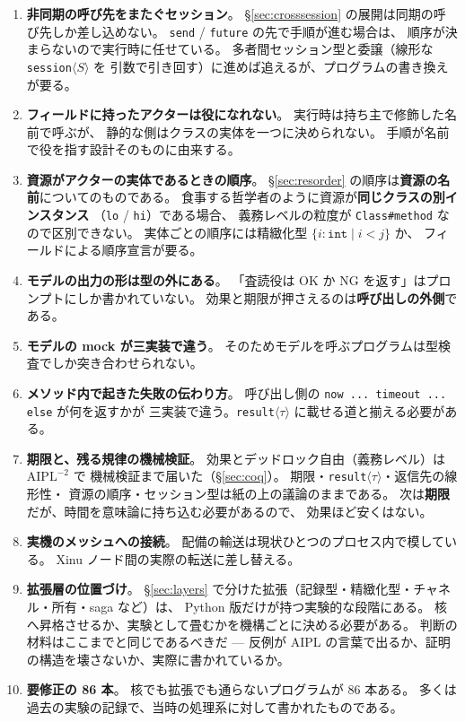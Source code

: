 \documentclass[11pt,a4paper]{ltjsarticle}
\theoremstyle{definition}
\theoremstyle{remark}
\begin{document}
\begin{enumerate}
\item \textbf{非同期の呼び先をまたぐセッション}。
      \S\ref{sec:crosssession} の展開は同期の呼び先しか差し込めない。
      \texttt{send} / \texttt{future} の先で手順が進む場合は、
      順序が決まらないので実行時に任せている。
      多者間セッション型と委譲（線形な \texttt{session}$\langle S\rangle$ を
      引数で引き回す）に進めば追えるが、プログラムの書き換えが要る。
\item \textbf{フィールドに持ったアクターは役になれない}。
      実行時は持ち主で修飾した名前で呼ぶが、
      静的な側はクラスの実体を一つに決められない。
      手順が名前で役を指す設計そのものに由来する。
\item \textbf{資源がアクターの実体であるときの順序}。
      \S\ref{sec:resorder} の順序は\textbf{資源の名前}についてのものである。
      食事する哲学者のように資源が\textbf{同じクラスの別インスタンス}
      （\texttt{lo} / \texttt{hi}）である場合、
      義務レベルの粒度が \texttt{Class\#method} なので区別できない。
      実体ごとの順序には精緻化型 $\{i:\mathtt{int} \mid i < j\}$ か、
      フィールドによる順序宣言が要る。
\item \textbf{モデルの出力の形は型の外にある}。
      「査読役は OK か NG を返す」はプロンプトにしか書かれていない。
      効果と期限が押さえるのは\textbf{呼び出しの外側}である。
\item \textbf{モデルの mock が三実装で違う}。
      そのためモデルを呼ぶプログラムは型検査でしか突き合わせられない。
\item \textbf{メソッド内で起きた失敗の伝わり方}。
      呼び出し側の \texttt{now ... timeout ... else} が何を返すかが
      三実装で違う。\texttt{result}$\langle\tau\rangle$ に載せる道と揃える必要がある。
\item \textbf{期限と、残る規律の機械検証}。
      効果とデッドロック自由（義務レベル）は $\mathrm{AIPL}^{-2}$ で
      機械検証まで届いた（\S\ref{sec:coq}）。
      期限・\texttt{result}$\langle\tau\rangle$・返信先の線形性・
      資源の順序・セッション型は紙の上の議論のままである。
      次は\textbf{期限}だが、時間を意味論に持ち込む必要があるので、
      効果ほど安くはない。
\item \textbf{実機のメッシュへの接続}。
      配備の輸送は現状ひとつのプロセス内で模している。
      Xinu ノード間の実際の転送に差し替える。
\item \textbf{拡張層の位置づけ}。
      \S\ref{sec:layers} で分けた拡張（記録型・精緻化型・チャネル・所有・saga など）は、
      Python 版だけが持つ実験的な段階にある。
      核へ昇格させるか、実験として畳むかを機構ごとに決める必要がある。
      判断の材料はここまでと同じであるべきだ ---
      反例が AIPL の言葉で出るか、証明の構造を壊さないか、実際に書かれているか。
\item \textbf{要修正の 86 本}。
      核でも拡張でも通らないプログラムが 86 本ある。
      多くは過去の実験の記録で、当時の処理系に対して書かれたものである。
\end{enumerate}
\end{document}
